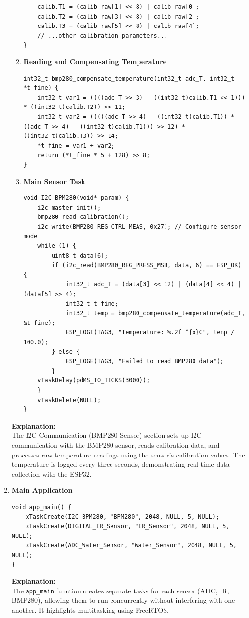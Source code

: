 \begin{enumerate}
\begin{enumerate}
\begin{lstlisting}
    calib.T1 = (calib_raw[1] << 8) | calib_raw[0];
    calib.T2 = (calib_raw[3] << 8) | calib_raw[2];
    calib.T3 = (calib_raw[5] << 8) | calib_raw[4];
    // ...other calibration parameters...
}
                 \end{lstlisting}
                 \item \textbf{Reading and Compensating Temperature}
                 \begin{lstlisting}
int32_t bmp280_compensate_temperature(int32_t adc_T, int32_t *t_fine) {
    int32_t var1 = ((((adc_T >> 3) - ((int32_t)calib.T1 << 1))) * ((int32_t)calib.T2)) >> 11;
    int32_t var2 = (((((adc_T >> 4) - ((int32_t)calib.T1)) * ((adc_T >> 4) - ((int32_t)calib.T1))) >> 12) * ((int32_t)calib.T3)) >> 14;
    *t_fine = var1 + var2;
    return (*t_fine * 5 + 128) >> 8;
}
                 \end{lstlisting}
                 \item \textbf{Main Sensor Task}
                 \begin{lstlisting}
void I2C_BPM280(void* param) {
    i2c_master_init();
    bmp280_read_calibration();
    i2c_write(BMP280_REG_CTRL_MEAS, 0x27); // Configure sensor mode
    while (1) {
        uint8_t data[6];
        if (i2c_read(BMP280_REG_PRESS_MSB, data, 6) == ESP_OK) {
            int32_t adc_T = (data[3] << 12) | (data[4] << 4) | (data[5] >> 4);
            int32_t t_fine;
            int32_t temp = bmp280_compensate_temperature(adc_T, &t_fine);
            ESP_LOGI(TAG3, "Temperature: %.2f ^{o}C", temp / 100.0);
        } else {
            ESP_LOGE(TAG3, "Failed to read BMP280 data");
        }
    vTaskDelay(pdMS_TO_TICKS(3000));
    }
    vTaskDelete(NULL);
}
                 \end{lstlisting}
             \end{enumerate}
             \textbf{Explanation:}\\
             The I2C Communication (BMP280 Sensor) section sets up I2C communication with the BMP280 sensor, reads calibration data, and processes raw temperature readings using the sensor’s calibration values. The temperature is logged every three seconds, demonstrating real-time data collection with the ESP32.
             \item \textbf{Main Application}
             \begin{lstlisting}
void app_main() {
    xTaskCreate(I2C_BPM280, "BPM280", 2048, NULL, 5, NULL);
    xTaskCreate(DIGITAL_IR_Sensor, "IR_Sensor", 2048, NULL, 5, NULL);
    xTaskCreate(ADC_Water_Sensor, "Water_Sensor", 2048, NULL, 5, NULL);
}
             \end{lstlisting}
             \textbf{Explanation:}\\
             The \texttt{app\_main} function creates separate tasks for each sensor (ADC, IR, BMP280), allowing them to run concurrently without interfering with one another. It highlights multitasking using FreeRTOS.
         \end{enumerate}
